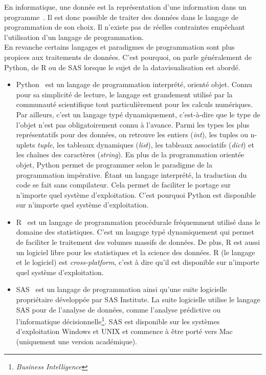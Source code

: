 \guillemotleft En informatique, une donnée est la représentation d'une information dans un programme\guillemotright ~\cite{Wiki}. Il est donc possible de traiter des données dans le langage de programmation de son choix. Il n'existe pas de réelles contraintes empêchant l'utilisation d'un langage de programmation.\\

En revanche certains langages et paradigmes de programmation sont plus propices aux traitements de données. C'est pourquoi, on parle généralement de Python, de R ou de SAS lorsque le sujet de la datavisualisation est abordé.
\begin{itemize}
\item Python~\cite{Python} est un langage de programmation interprété, orienté objet. Connu pour sa simplicité de lecture, le langage est grandement utilisé par la communauté scientifique tout particulièrement pour les calculs numériques. Par ailleurs, c'est un langage typé dynamiquement, c'est-à-dire que le type de l'objet n'est pas obligatoirement connu à l'avance. Parmi les types les plus représentatifs pour des données, on retrouve les entiers (\textit{int}), les tuples ou n-uplets \textit{tuple}, les tableaux dynamiques (\textit{list}), les tableaux associatifs (\textit{dict}) et les chaînes des caractères (\textit{string}). En plus de la programmation orientée objet, Python permet de programmer selon le paradigme de la programmation impérative. Étant un langage interprété, la traduction du code se fait sans compilateur. Cela permet de faciliter le portage sur n'importe quel système d'exploitation. C'est pourquoi Python est disponible sur n'importe quel système d'exploitation.
\item R~\cite{R} est un langage de programmation procédurale fréquemment utilisé dans le domaine des statistiques. C'est un langage typé dynamiquement qui permet de faciliter le traitement des volumes massifs de données. De plus, R est aussi un logiciel libre pour les statistiques et la science des données. R (le langage et le logiciel) est \textit{cross-platform}, c'est à dire qu'il est disponible sur n'importe quel système d'exploitation.
\item SAS~\cite{SAS} est un langage de programmation ainsi qu'une suite logicielle propriétaire développée par SAS Institute. La suite logicielle utilise le langage SAS pour de l'analyse de données, comme l'analyse prédictive ou l'informatique décisionnelle\footnote{\textit{Business Intelligence}}. SAS est disponible sur les systèmes d'exploitation Windows et UNIX et commence à être porté vers Mac (uniquement une version académique).
\end{itemize}